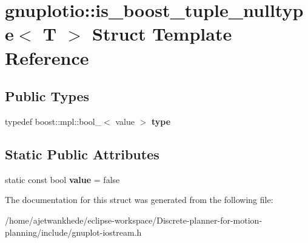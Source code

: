 \hypertarget{structgnuplotio_1_1is__boost__tuple__nulltype}{}\section{gnuplotio\+:\+:is\+\_\+boost\+\_\+tuple\+\_\+nulltype$<$ T $>$ Struct Template Reference}
\label{structgnuplotio_1_1is__boost__tuple__nulltype}
\subsection*{Public Types}
\begin{DoxyCompactItemize}
\item 
\mbox{\label{structgnuplotio_1_1is__boost__tuple__nulltype_a6b9e2eaadcaa5c788131d4e9e4186349}} 
typedef boost\+::mpl\+::bool\+\_\+$<$ value $>$ {\bfseries type}
\end{DoxyCompactItemize}
\subsection*{Static Public Attributes}
\begin{DoxyCompactItemize}
\item 
\mbox{\label{structgnuplotio_1_1is__boost__tuple__nulltype_aed42a98e58eb94c7ba55ea7d2a8f7fd2}} 
static const bool {\bfseries value} = false
\end{DoxyCompactItemize}


The documentation for this struct was generated from the following file\+:\begin{DoxyCompactItemize}
\item 
/home/ajetwankhede/eclipse-\/workspace/\+Discrete-\/planner-\/for-\/motion-\/planning/include/gnuplot-\/iostream.\+h\end{DoxyCompactItemize}
